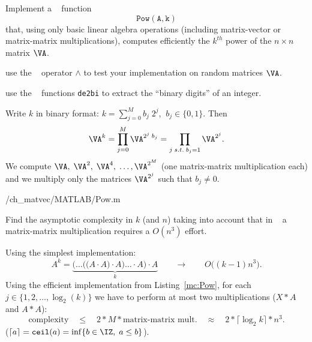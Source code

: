 \renewcommand{\chpt}{ch_matvec}

\begin{problem} \label{prb:Powers}

\begin{subproblem}[2] \label{subprb:Powers_1}
Implement a \Matlab~ function
$$\mathtt{Pow(A,k)}$$
that, using only basic linear algebra operations (including matrix-vector or matrix-matrix multiplications),
computes efficiently the $k^{th}$ power of the $n\times n$ matrix $\VA$.

\begin{hint}
 use the \Matlab~ operator $\wedge$ to test your implementation on random matrices $\VA$.
\end{hint}

\begin{hint}
 use the \Matlab~ functions \texttt{de2bi} to extract the ``binary digits'' of an integer.
\end{hint}

\begin{solution}
Write $k$ in binary format: $k=\sum_{j=0}^M b_j\;2^j$,  $\:b_j\in\{0,1\}$. Then
$$\VA^k = \prod_{j=0}^M \VA^{2^j\; b_j} = \prod_{j\;s.t.\;b_j=1} \VA^{2^j}. $$
We compute $\VA,\;\VA^2,\;\VA^4,\;\ldots,\VA^{2^M}$ (one matrix-matrix multiplication each) and we multiply only the matrices $\VA^{2^j}$ such that $b_j\ne 0$.


{\problems/\chpt/MATLAB/Pow.m}
\end{solution}
\end{subproblem}



\begin{subproblem}[1] \label{subprb:Powers_2}
Find the asymptotic complexity in $k$ (and $n$) taking into account that in \Matlab~ a matrix-matrix multiplication requires a $O(n^3)$ effort.

\begin{solution}
Using the simplest implementation:
$$A^k = \underbrace{\bigg(\ldots\Big(\big(A\cdot A\big)\cdot A\Big)\ldots \cdot A \bigg)\cdot A}_{k} \qquad \rightarrow \qquad O\big((k-1)n^3\big).$$
Using the efficient implementation from Listing~\ref{mc:Pow}, for each $j\in\{1,2,\ldots,\log_2(k)\}$
we have to perform at most two multiplications ($X*A$ and $A*A$):
$$ \text{complexity}\quad\leq \quad 2 * M * \text{matrix-matrix mult.} \quad \approx \quad 2 * \lceil\log_2 k\rceil * n^3.$$
($\lceil a\rceil = \mathtt{ceil}(a) =\inf\{ b\in\IZ,\; a\leq b\} $).
\end{solution}
\end{subproblem}



\end{problem}
